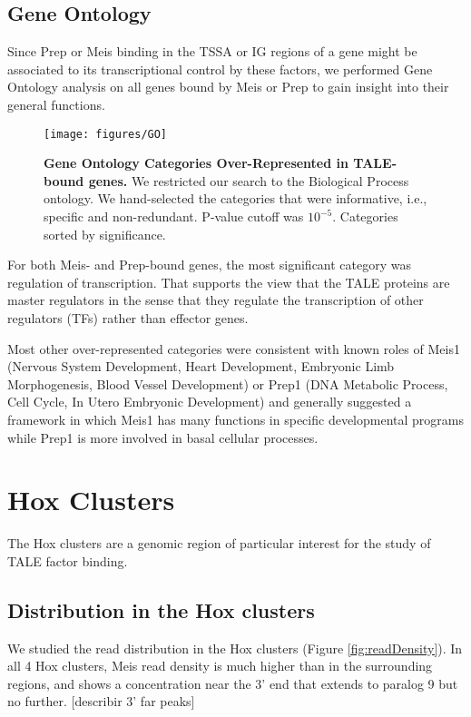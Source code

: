 \subsection{Gene Ontology}

Since Prep or Meis binding in the \ac{TSSA} or \ac{IG} regions of a gene might be associated to its transcriptional control by these factors, we performed Gene Ontology analysis on all genes bound by Meis or Prep to gain insight into their general functions. 

\begin{SCfigure}[]
  \centering
  \texttt{[image: figures/GO]}
  \caption[Gene Ontology Categories Over-Represented in TALE-bound genes]{\textbf{Gene Ontology Categories Over-Represented in TALE-bound genes.} We restricted our search to the Biological Process ontology. We hand-selected the categories that were informative, i.e., specific and non-redundant. P-value cutoff was $10^{-5}$. Categories sorted by significance.}
  \label{fig:GO}
\end{SCfigure}

For both Meis- and Prep-bound genes, the most significant category was regulation of transcription. That supports the view that the \ac{TALE} proteins are master regulators in the sense that they regulate the transcription of other regulators (\acp{TF}) rather than effector genes. 

Most other over-represented categories were consistent with known roles of Meis1 (Nervous System Development, Heart Development, Embryonic Limb Morphogenesis, Blood Vessel Development) or Prep1 (DNA Metabolic Process, Cell Cycle, In Utero Embryonic Development) and generally suggested a framework in which Meis1 has many functions in specific developmental programs while Prep1 is more involved in basal cellular processes.


\section{Hox Clusters}

The Hox clusters are a genomic region of particular interest for the study of \ac{TALE} factor binding. 

\subsection{Distribution in the Hox clusters}

We studied the read distribution in the Hox clusters (Figure \ref{fig:readDensity}). In all 4 Hox clusters, Meis read density is much higher than in the surrounding regions, and shows a concentration near the 3' end that extends to paralog 9 but no further. [describir 3' far peaks]

